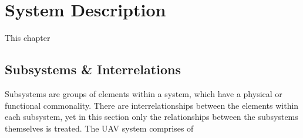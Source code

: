 \chapter{System Description}
\setlength{\parindent}{15pt}
\label{ch:syst_desc}

 
This chapter 



\section{Subsystems \& Interrelations}
\label{sec:subs_inte}

Subsystems are groups of elements within a system, which have a physical or functional commonality. There are interrelationships between the elements within each subsystem, yet in this section only the relationships between the subsystems themselves is treated. The UAV system comprises of 




